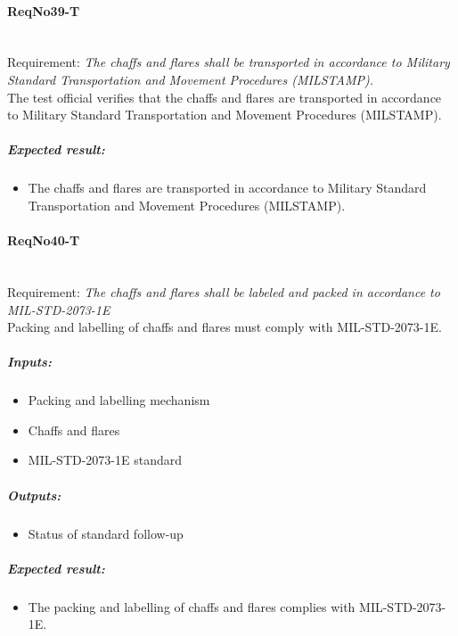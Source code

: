 \paragraph{ReqNo39-T}\mbox{}\\ %
Requirement: \textit{The chaffs and flares shall be transported in accordance to Military Standard Transportation and Movement Procedures (MILSTAMP).}\\

The test official verifies that the chaffs and flares are transported in accordance to Military Standard Transportation and Movement Procedures (MILSTAMP).

\subparagraph{Expected result:}
	\begin{itemize}
	\item The chaffs and flares are transported in accordance to Military Standard Transportation and Movement Procedures (MILSTAMP).
	\end{itemize}

\paragraph{ReqNo40-T}\mbox{}\\ %
Requirement: \textit{The chaffs and flares shall be labeled and packed in accordance to MIL-STD-2073-1E}\\
Packing and labelling of chaffs and flares must comply with MIL-STD-2073-1E.
	\subparagraph{Inputs:}
	\begin{itemize}
	\item Packing and labelling mechanism
	\item Chaffs and flares
	\item MIL-STD-2073-1E standard
	\end{itemize}
	\subparagraph{Outputs:}
	\begin{itemize}
	\item Status of standard follow-up
	\end{itemize}
	\subparagraph{Expected result:}
	\begin{itemize}
	\item The packing and labelling of chaffs and flares complies with MIL-STD-2073-1E.
	\end{itemize}